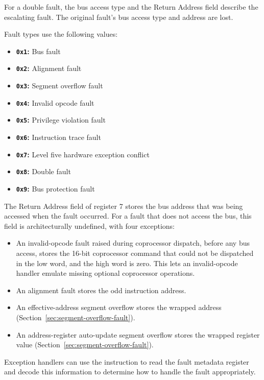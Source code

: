 For a double fault, the bus access type and the Return Address field describe the escalating fault. The original
fault's bus access type and address are lost.

Fault types use the following values:

\begin{itemize}
	\item \textbf{\texttt{0x1}:} Bus fault
	\item \textbf{\texttt{0x2}:} Alignment fault
	\item \textbf{\texttt{0x3}:} Segment overflow fault
	\item \textbf{\texttt{0x4}:} Invalid opcode fault
	\item \textbf{\texttt{0x5}:} Privilege violation fault
	\item \textbf{\texttt{0x6}:} Instruction trace fault
	\item \textbf{\texttt{0x7}:} Level five hardware exception conflict
	\item \textbf{\texttt{0x8}:} Double fault
	\item \textbf{\texttt{0x9}:} Bus protection fault
\end{itemize}

The Return Address field of register 7 stores the bus address that was being accessed when the fault occurred. For a
fault that does not access the bus, this field is architecturally undefined, with four exceptions:

\begin{itemize}
	\item An invalid-opcode fault raised during coprocessor dispatch, before any bus access, stores the 16-bit coprocessor
	      command that could not be dispatched in the low word, and the high word is zero. This lets an invalid-opcode handler
	      emulate missing optional coprocessor operations.
	\item An alignment fault stores the odd instruction address.
	\item An effective-address segment overflow stores the wrapped address (Section~\ref{sec:segment-overflow-fault}).
	\item An address-register auto-update segment overflow stores the wrapped register value
	      (Section~\ref{sec:segment-overflow-fault}).
\end{itemize}

Exception handlers can use the  instruction to read the fault metadata register and decode this
information to determine how to handle the fault appropriately.

